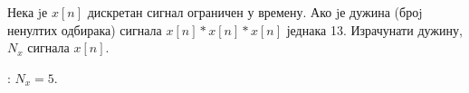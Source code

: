 \PID
Нека jе $x[n]$ дискретан сигнал ограничен у времену. Ако jе дужина (броj ненултих одбирака)
сигнала $x[n] \ast x[n] \ast x[n]$ једнака 13. Израчунати дужину, $N_x$ сигнала $x[n]$. 
\vspace*{2mm}

: $N_x = 5$.